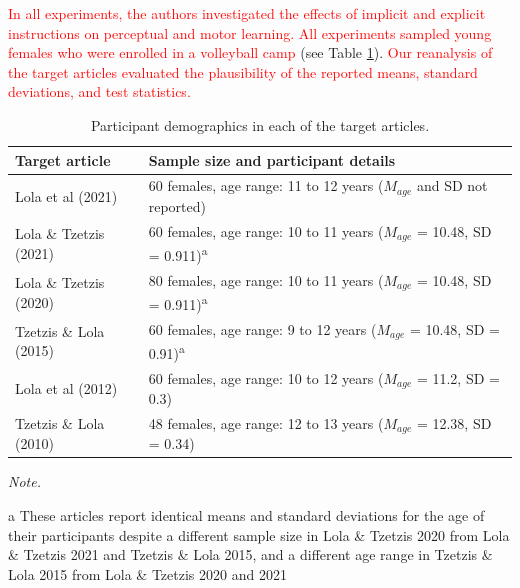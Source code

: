 \documentclass[
  english,
  man, donotrepeattitle,floatsintext]{apa7}
\begin{document}
\textcolor{red}{In all experiments, the authors investigated the effects of implicit and explicit instructions on perceptual and motor learning. All experiments sampled young females who were enrolled in a volleyball camp} (see Table \ref{tab:table1}). \textcolor{red}{Our reanalysis of the target articles evaluated the plausibility of the reported means, standard deviations, and test statistics.}

\vspace{3ex}

\begin{table}

\caption{\label{tab:table1}Participant demographics in each of the target articles.}
\fontsize{11}{13}\selectfont
\begin{threeparttable}
\begin{tabular}[t]{ll}
\toprule
Target article & Sample size and participant details\\
\midrule
Lola et al (2021) & 60 females, age range: 11 to 12 years ($M_{age}$ and SD not reported)\\
Lola \& Tzetzis (2021) & 60 females, age range: 10 to 11 years ($M_{age}$ = 10.48, SD = 0.911)\textsuperscript{a}\\
Lola \& Tzetzis (2020) & 80 females, age range: 10 to 11 years ($M_{age}$ = 10.48, SD = 0.911)\textsuperscript{a}\\
Tzetzis \& Lola (2015) & 60 females, age range: 9 to 12 years ($M_{age}$ = 10.48, SD = 0.91)\textsuperscript{a}\\
Lola et al (2012) & 60 females, age range: 10 to 12 years ($M_{age}$ = 11.2, SD = 0.3)\\
Tzetzis \& Lola (2010) & 48 females, age range: 12 to 13 years ($M_{age}$ = 12.38, SD = 0.34)\\
\bottomrule
\end{tabular}
\begin{tablenotes}
\item \textit{Note.} 
\item[a] These articles report identical means and standard deviations for the age of their participants despite a different sample size in Lola \& Tzetzis 2020 from Lola \& Tzetzis 2021 and Tzetzis \& Lola 2015, and a different age range in Tzetzis \& Lola 2015 from Lola \& Tzetzis 2020 and 2021
\end{tablenotes}
\end{threeparttable}
\end{table}
\end{document}
